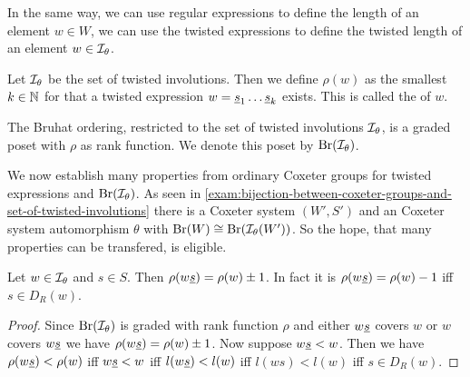 In the same way, we can use regular expressions to define the length of an element $w \in W$, we can use the twisted expressions to define the twisted length of an element $w \in \mathcal{I}_{\theta}$.

\begin{defi}
	Let $\mathcal{I}_{\theta}$ be the set of twisted involutions. Then we define $\rho(w)$ as the smallest $k \in \mathbb{N}$ for that a twisted expression $w = \underline{s}_1 \ldots \underline{s}_k$ exists. This is called the  of $w$.
\end{defi}

\begin{lemm}
	The Bruhat ordering, restricted to the set of twisted involutions $\mathcal{I}_{\theta}$, is a graded poset with $\rho$ as rank function. We denote this poset by $\operatorname{Br}(\mathcal{I}_{\theta})$.
\end{lemm}

We now establish many properties from ordinary Coxeter groups for twisted expressions and $\operatorname{Br}(\mathcal{I}_{\theta})$. As seen in \ref{exam:bijection-between-coxeter-groups-and-set-of-twisted-involutions} there is a Coxeter system $(W',S')$ and an Coxeter system automorphism $\theta$ with $\operatorname{Br}(W) \cong \operatorname{Br}(\mathcal{I}_{\theta}(W'))$. So the hope, that many properties can be transfered, is eligible.

\begin{lemm}
	Let $w \in \mathcal{I}_{\theta}$ and $s \in S$. Then $\rho(w \underline{s}) = \rho(w) \pm 1$. In fact it is $\rho(w \underline{s}) = \rho(w) - 1$ iff $s \in D_R(w)$.

	\begin{proof}
		Since $\operatorname{Br}(\mathcal{I}_{\theta})$ is graded with rank function $\rho$ and either $w \underline{s}$ covers $w$ or $w$ covers $w \underline{s}$ we have $\rho(w \underline{s}) = \rho(w) \pm 1$. Now suppose $w \underline{s} < w$. Then we have $\rho(w \underline{s}) < \rho(w)$ iff $w \underline{s} < w$ iff $l(w \underline{s}) < l(w)$ iff $l(ws) < l(w)$ iff $s \in D_R(w)$.
	\end{proof}
\end{lemm}


